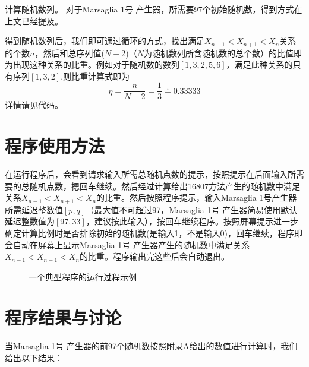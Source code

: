 \documentclass[a4paper,11pt]{article}
\begin{document}
计算随机数列。
对于Marsaglia 1号 产生器，所需要97个初始随机数，得到方式在上文已经提及。

得到随机数列后，我们即可通过循环的方式，找出满足$X_{n-1} < X_{n+1} < X_{n}$关系的个数$n$，然后和总序列值($N-2$)（$N$为随机数列所含随机数的总个数）的比值即为出现这种关系的比重。例如对于随机数的数列$[1,3,2,5,6]$，满足此种关系的只有序列$[1,3,2]$,则比重计算式即为
\begin{equation}
	\eta = \frac{n}{N-2} = \frac{1}{3} \doteq 0.33333
\end{equation}
详情请见代码。

\section{程序使用方法}
在运行程序后，会看到请求输入所需总随机点数的提示，按照提示在后面输入所需要的总随机点数，摁回车继续。然后经过计算给出16807方法产生的随机数中满足关系$X_{n-1} < X_{n+1} < X_{n}$的比重。然后按照程序提示，输入Marsaglia 1号产生器所需延迟整数值$[p,q]$（最大值不可超过97，Marsaglia 1号 产生器简易使用默认延迟整数值为$[97,33]$，建议按此输入），按回车继续程序。按照屏幕提示进一步确定计算比例时是否排除初始的随机数(是输入1，不是输入0)，回车继续，程序即会自动在屏幕上显示Marsaglia 1号 产生器产生的随机数中满足关系$X_{n-1} < X_{n+1} < X_{n}$的比重。程序输出完这些后会自动退出。
\begin{figure}[htb]        
\caption{\label{1} 一个典型程序的运行过程示例}      
\end{figure}

\newpage
\section{程序结果与讨论}

当Marsaglia 1号 产生器的前97个随机数按照附录A给出的数值进行计算时，我们给出以下结果：
\begin{table}[!htb]
\centering
{}
\caption{满足$X_{n-1} < X_{n+1} < X_{n}$关系比重一览表}
\end{table}
\end{document}
